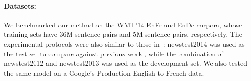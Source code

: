 \documentclass{article} \pdfoutput=1
\begin{document}
\paragraph{Datasets:} We benchmarked our method on the WMT'14 EnFr and EnDe corpora, whose training sets have 36M sentence pairs and 5M sentence pairs, respectively. The experimental protocols were also similar to those in~\citep{GNMT}: newstest2014 was used as the test set to compare against previous work \citep{LuongPM:2015:EAANMT,Zhou:2016:DeppAtt,GNMT}, while the combination of newstest2012 and newstest2013 was used as the development set.  We also tested the same model on a Google's Production English to French data.


\begin{table}[h!]
\caption{Results on WMT'14 En Fr newstest2014 (bold values represent best results).}
\label{tab:wmtenfr}
\begin{center}
\setlength\tabcolsep{2pt}
\vspace{-5pt}
\end{center}
\end{table}
\end{document}
